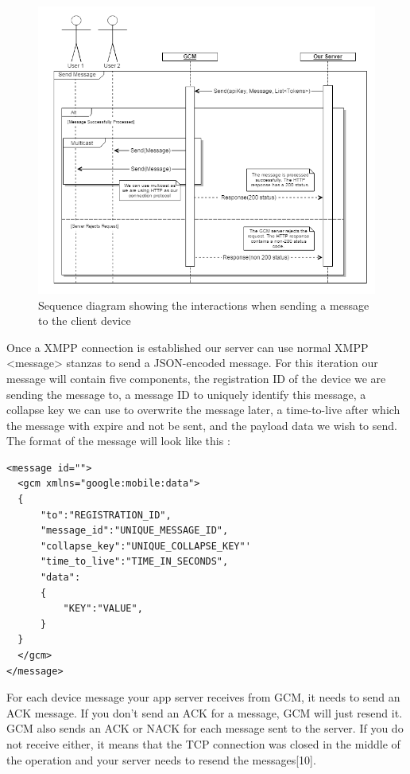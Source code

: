 \documentclass{article}
\begin{document}
	\begin{figure}[H]
		\centering
		\includegraphics[width=1\textwidth]{"GCM Send Message Sequence Diagram - Iteration 0"}
		\caption{Sequence diagram showing the interactions when sending a message to the client device}
	\end{figure}
	
	Once a XMPP connection is established our server can use normal XMPP <message> stanzas to send a JSON-encoded message. For this iteration our message will contain five components, the registration ID of the device we are sending the message to, a message ID to uniquely identify this message, a collapse key we can use to overwrite the message later, a time-to-live after which the message with expire and not be sent, and the payload data we wish to send. The format of the message will look like this :
	\begin{lstlisting}
<message id="">
  <gcm xmlns="google:mobile:data">
  {
      "to":"REGISTRATION_ID",
      "message_id":"UNIQUE_MESSAGE_ID",
      "collapse_key":"UNIQUE_COLLAPSE_KEY"'
      "time_to_live":"TIME_IN_SECONDS",
      "data":
      {
          "KEY":"VALUE",
      }
  }
  </gcm>
</message>

	\end{lstlisting}
	For each device message your app server receives from GCM, it needs to send an ACK message. If you don't send an ACK for a message, GCM will just resend it. GCM also sends an ACK or NACK for each message sent to the server. If you do not receive either, it means that the TCP connection was closed in the middle of the operation and your server needs to resend the messages[10]. \\
\end{document}
